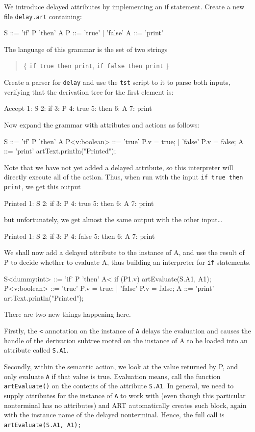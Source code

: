 We introduce delayed attributes by implementing an {\sf if} statement. Create a new file {\tt delay.art} containing:
\begin{codeblock}
S ::= 'if' P 'then' A 
P ::= 'true' | 'false'  
A ::= 'print' 
\end{codeblock}
The language of this grammar is the set of two strings \begin{quote}\{ \verb+if true then print+, \verb+if false then print+ \}\end{quote} 
Create a parser for {\tt delay} and use the {\tt tst} script to it to parse both inputs, verifying that the derivation tree for the first element is:
\begin{codeblock}
Accept
1: S
  2: if
  3: P
    4: true
  5: then
  6: A
    7: print
\end{codeblock}
Now expand the grammar with attributes and actions as follows:
\begin{codeblock}
S ::= 'if' P 'then' A 
P<v:boolean> ::= 'true' {P.v = true;} | 'false' {P.v = false;}  
A ::= 'print' {artText.println("Printed");}  
\end{codeblock}
Note that we have not yet added a delayed attribute, so this interpreter will directly execute all of the action. Thus, when run with the input \verb+if true then print+, we get this output
\begin{codeblock}
Printed
1: S
  2: if
  3: P
    4: true
  5: then
  6: A
    7: print
\end{codeblock}
but unfortunately, we get almost the same output with the other input\ldots
\begin{codeblock}
Printed
1: S
  2: if
  3: P
    4: false
  5: then
  6: A
    7: print
\end{codeblock}
We shall now add a delayed attribute to the instance of A, and use the result of P to decide whether to evaluate A, thus building an interpreter for {\tt if} statements.
\begin{codeblock}
S<dummy:int> ::= 'if' P 'then' A< { if (P1.v) artEvaluate(S.A1, A1);}  
P<v:boolean> ::= 'true' {P.v = true;} | 'false' {P.v = false;}  
A ::= 'print' {artText.println("Printed");}  
\end{codeblock}
There are two new things happening here. 

Firstly, the \verb+<+ annotation on the instance of {\tt A} delays the evaluation and causes the handle of the derivation subtree rooted on the instance of A to be loaded into an attribute called {\tt S.A1}.

Secondly, within the semantic action, we look at the value returned by P, and only evaluate {\tt A} if that value is true. Evaluation means, call the function {\tt artEvaluate()} on the contents of the attribute {\tt S.A1}. In general, we need to supply attributes for the instance of {\tt A} to work with (even though this particular nonterminal has no attributes) and ART automatically creates such  block, again with the instance name of the delayed nonterminal. Hence, the full call is \verb+artEvaluate(S.A1, A1);+


